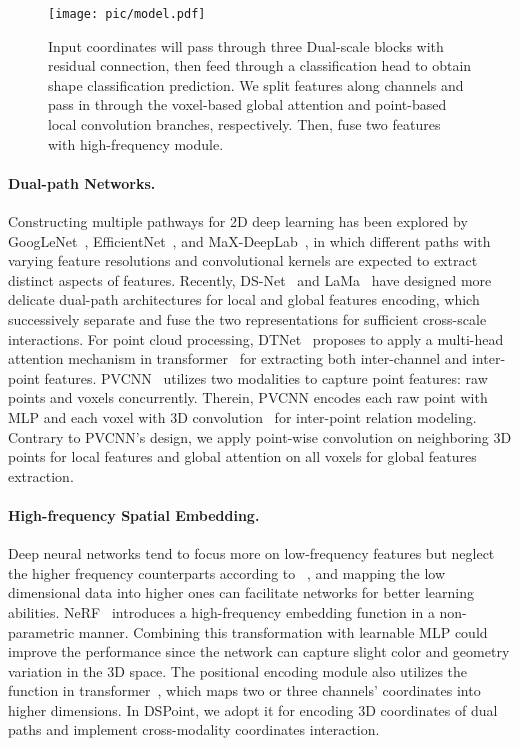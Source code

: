 \documentclass[sigconf]{acmart}
\begin{document}
\begin{figure*}[t]
  \centering
    \texttt{[image: pic/model.pdf]}
  \caption{Input coordinates will pass through three Dual-scale blocks with residual connection, then feed through a classification head to obtain shape classification prediction. We split features along channels and pass in through the voxel-based global attention and point-based local convolution branches, respectively. Then, fuse two features with high-frequency module. 
  }
    \label{diagram}
    \vspace{-0.5cm}
\end{figure*}
\paragraph{Dual-path Networks.} Constructing multiple pathways for 2D deep learning has been explored by GoogLeNet~\cite{szegedy2015going}, EfficientNet~\cite{tan2019efficientnet}, and MaX-DeepLab~\cite{wang2021max}, in which different paths with varying feature resolutions and convolutional kernels are expected to extract distinct aspects of features. Recently, DS-Net~\cite{mao2021dual} and LaMa~\cite{suvorov2021resolution} have designed more delicate dual-path architectures for local and global features encoding, which successively separate and fuse the two representations for sufficient cross-scale interactions. For point cloud processing, DTNet~\cite{han2021dual} proposes to apply a multi-head attention mechanism in transformer~\cite{vaswani2017attention} for extracting both inter-channel and inter-point features. PVCNN~\cite{liu2019point} utilizes two modalities to capture point features: raw points and voxels concurrently. Therein, PVCNN encodes each raw point with MLP and each voxel with 3D convolution~\cite{liu2019point} for inter-point relation modeling. Contrary to PVCNN's design, we apply point-wise convolution on neighboring 3D points for local features and global attention on all voxels for global features extraction.

\paragraph{High-frequency Spatial Embedding.} 
Deep neural networks tend to focus more on low-frequency features but neglect the higher frequency counterparts according to ~\cite{mildenhall2020nerf}, and mapping the low dimensional data into higher ones can facilitate networks for better learning abilities.  NeRF~\cite{mildenhall2020nerf} introduces a high-frequency embedding function in a non-parametric manner.  Combining this transformation with learnable MLP could improve the performance since the network can capture slight color and geometry variation in the 3D space. The positional encoding module also utilizes the function in transformer~\cite{vaswani2017attention}, which maps two or three channels' coordinates into higher dimensions.  In DSPoint, we adopt it for encoding 3D coordinates of dual paths and implement cross-modality coordinates interaction.
\end{document}
